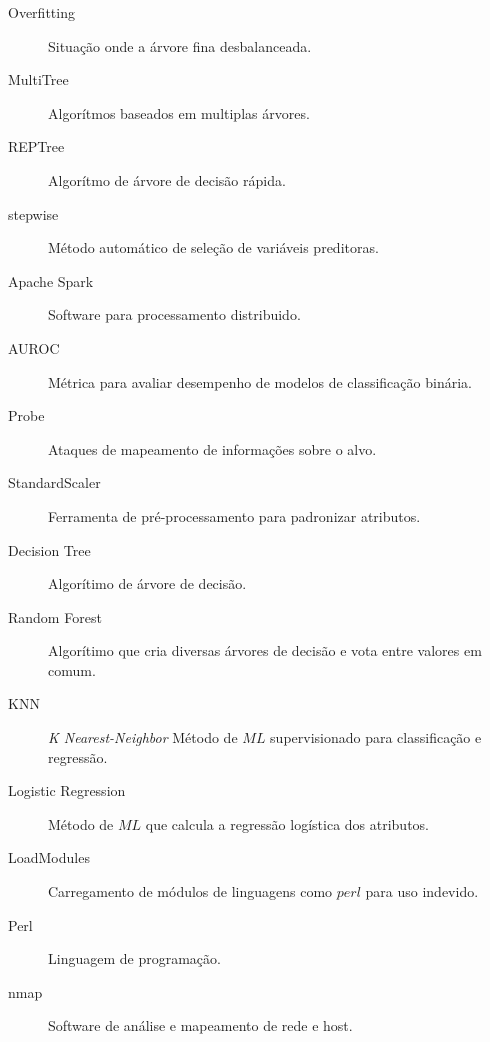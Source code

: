 \begin{description}
\item[Overfitting] Situação onde a árvore fina desbalanceada.
\item[MultiTree] Algorítmos baseados em multiplas árvores.
\item[REPTree] Algorítmo de árvore de decisão rápida.
\item[stepwise] Método automático de seleção de variáveis preditoras.
\item[Apache Spark] Software para processamento distribuido.
\item[AUROC] Métrica para avaliar desempenho de modelos de classificação binária.
\item[Probe] Ataques de mapeamento de informações sobre o alvo.
\item[StandardScaler] Ferramenta de pré-processamento para padronizar atributos.
\item[Decision Tree] Algorítimo de árvore de decisão.
\item[Random Forest] Algorítimo que cria diversas árvores de decisão e vota entre valores em comum.
\item[KNN] \textit{K Nearest-Neighbor} Método de $ML$ supervisionado para classificação e regressão.
\item[Logistic Regression] Método de $ML$ que calcula a regressão logística dos atributos.
\item[LoadModules] Carregamento de módulos de linguagens como $perl$ para uso indevido.
\item[Perl] Linguagem de programação.
\item[nmap] Software de análise e mapeamento de rede e host.
	
\end{description}
